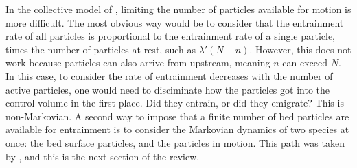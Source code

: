 In the collective model of \citet{Ancey2008}, limiting the number of particles available for motion is more difficult. 
The most obvious way would be to consider that the entrainment rate of all particles is proportional to the entrainment rate of a single particle, times the number of particles at rest, such as $\lambda'(N-n)$. 
However, this does not work because particles can also arrive from upstream, meaning $n$ can exceed $N$. 
In this case, to consider the rate of entrainment decreases with the number of active particles, one would need to disciminate how the particles got into the control volume in the first place. 
Did they entrain, or did they emigrate?
This is non-Markovian. 
A second way to impose that a finite number of bed particles are available for entrainment is to consider the Markovian dynamics of two species at once: the bed surface particles, and the particles in motion. 
This path was taken by \citet{Turowski2009}, and this is the next section of the review. 
